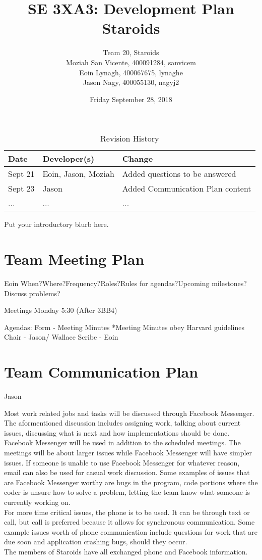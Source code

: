\documentclass{article}
\title{SE 3XA3: Development Plan\\Staroids}
\author{Team 20, Staroids
		\\ Moziah San Vicente, 400091284, sanvicem
		\\ Eoin Lynagh, 400067675, lynaghe
		\\ Jason Nagy, 400055130, nagyj2
}
\date{Friday September 28, 2018}
\begin{document}
\begin{table}[hp]
\caption{Revision History} \label{TblRevisionHistory}
\begin{tabularx}{\textwidth}{llX}
\toprule
\textbf{Date} & \textbf{Developer(s)} & \textbf{Change}\\
\midrule
Sept 21 & Eoin, Jason, Moziah & Added questions to be answered\\
Sept 23 & Jason & Added Communication Plan content\\
... & ... & ...\\
\bottomrule
\end{tabularx}
\end{table}

\newpage

\maketitle

Put your introductory blurb here.

\section{Team Meeting Plan}
Eoin
When?Where?Frequency?Roles?Rules for agendas?Upcoming milestones?Discuss problems?

Meetings Monday 5:30 (After 3BB4)

Agendas:
Form - Meeting Minutes
*Meeting Minutes obey Harvard guidelines
Chair - Jason/ Wallace
Scribe - Eoin

\section{Team Communication Plan}
Jason

Most work related jobs and tasks will be discussed through Facebook Messenger. The aformentioned discussion includes assigning work, talking about current issues, discussing what is next and how implementations should be done. Facebook Messenger will be used in addition to the scheduled meetings. The meetings will be about larger issues while Facebook Messenger will have simpler issues. If someone is unable to use Facebook Messenger for whatever reason, email can also be used for casual work discussion. Some examples of issues that are Facebook Messenger worthy are bugs in the program, code portions where the coder is unsure how to solve a problem, letting the team know what someone is currently working on.\\
For more time critical issues, the phone is to be used. It can be through text or call, but call is preferred because it allows for synchronous communication. Some example issues worth of phone communication include questions for work that are due soon and application crashing bugs, should they occur.\\
The members of Staroids have all exchanged phone and Facebook information.\\
\end{document}
